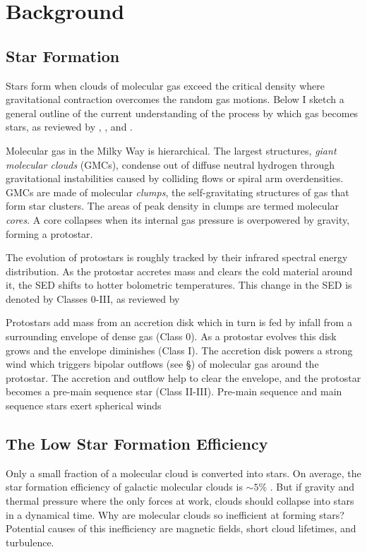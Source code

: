 \section{Background}\label{sec:bkgrd}

\subsection{Star Formation}\label{sec:sf}
Stars form when clouds of molecular gas exceed the critical density where gravitational contraction overcomes the random gas motions. Below I sketch a general outline of the current understanding of the process by which gas becomes stars, as reviewed by \cite{McKee_2007}, \cite{Draine11}, and \cite{Dunham_2014}. 

Molecular gas in the Milky Way is hierarchical. The largest structures, \textit{giant molecular clouds} (GMCs), condense out of diffuse neutral hydrogen through gravitational instabilities caused by colliding flows or spiral arm overdensities. GMCs are made of molecular \textit{clumps}, the self-gravitating structures of gas that form star clusters. The areas of peak density in clumps are termed molecular \textit{cores}. A core collapses when its internal gas pressure is overpowered by gravity, forming a protostar.

The evolution of protostars is roughly tracked by their infrared spectral energy distribution. As the protostar accretes mass and clears the cold material around it, the SED shifts to hotter bolometric temperatures. This change in the SED is denoted by Classes 0-III, as reviewed by 

Protostars add mass from an accretion disk which in turn is fed by infall from a surrounding envelope of dense gas (Class 0). As a protostar evolves this disk grows and the envelope diminishes (Class I). The accretion disk powers a strong wind which triggers bipolar outflows (see \S\cite{sec:outflow}) of molecular gas around the protostar. The accretion and outflow help to clear the envelope, and the protostar becomes a pre-main sequence star (Class II-III). Pre-main sequence and main sequence stars exert spherical winds 

\subsection{The Low Star Formation Efficiency}\label{sec:sfe}
Only a small fraction of a molecular cloud is converted into stars. On average, the star formation efficiency of galactic molecular clouds is $\sim 5\%$ \cite{McKee_2007}. But if gravity and thermal pressure where the only forces at work, clouds should collapse into stars in a dynamical time. Why are molecular clouds so inefficient at forming stars? Potential causes of this inefficiency are magnetic fields, short cloud lifetimes, and turbulence. 

